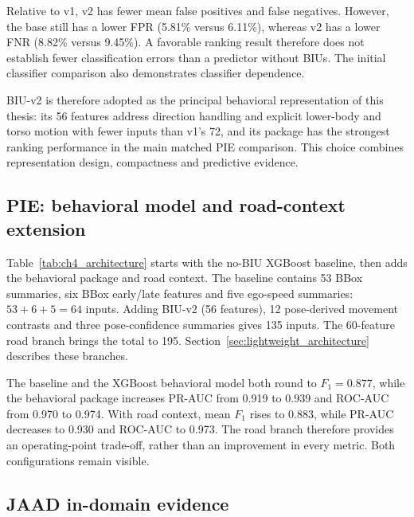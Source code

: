 Relative to v1, v2 has fewer mean false positives and false negatives. However, the
base still has a lower FPR (5.81\% versus 6.11\%), whereas v2 has a lower FNR
(8.82\% versus 9.45\%). A favorable ranking result
therefore does not establish fewer classification errors than a predictor without BIUs.
The initial classifier comparison also demonstrates classifier dependence.

BIU-v2 is therefore adopted as the principal behavioral representation of this thesis: its 56 features address
direction handling and explicit lower-body and torso motion with fewer inputs than v1's
72, and its package has the strongest ranking performance in the main matched PIE
comparison. This choice combines representation design, compactness and predictive
evidence.

\FloatBarrier

\subsection{PIE: behavioral model and road-context extension}\label{sec:ch4_xgb_pie}

Table~\ref{tab:ch4_architecture} starts with the no-BIU XGBoost baseline, then adds
the behavioral package and road context. The baseline contains 53 BBox summaries,
six BBox early/late features and five ego-speed summaries: $53+6+5=64$ inputs.
Adding BIU-v2 (56 features), 12 pose-derived movement contrasts and three pose-confidence
summaries gives 135 inputs. The 60-feature road branch brings the total to 195.
Section~\ref{sec:lightweight_architecture} describes these branches.



The baseline and the XGBoost behavioral model both round to $F_1=0.877$, while the behavioral package
increases PR-AUC from 0.919 to 0.939 and ROC-AUC from 0.970 to 0.974.
With road context,
mean $F_1$ rises to 0.883, while PR-AUC decreases to 0.930 and ROC-AUC to 0.973.
The road branch therefore provides an operating-point trade-off, rather than an
improvement in every metric. Both configurations remain visible.

\FloatBarrier
\subsection{JAAD in-domain evidence}\label{sec:ch4_jaad}

